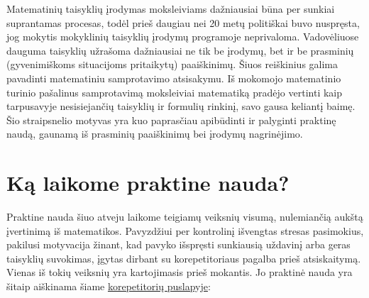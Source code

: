 \documentclass{article}
\begin{document}
Matematinių taisyklių įrodymas moksleiviams dažniausiai būna per sunkiai suprantamas procesas, todėl prieš daugiau nei 20 metų politiškai buvo nuspręsta, jog mokytis mokyklinių taisyklių įrodymų programoje neprivaloma. Vadovėliuose dauguma taisyklių užrašoma dažniausiai ne tik be įrodymų, bet ir be prasminių (gyvenimiškoms situacijoms pritaikytų) paaiškinimų. Šiuos reiškinius galima pavadinti matematiniu samprotavimo atsisakymu. Iš mokomojo matematinio turinio pašalinus samprotavimą moksleiviai matematiką pradėjo vertinti kaip tarpusavyje nesisiejančių taisyklių ir formulių rinkinį, savo gausa keliantį baimę. Šio straipsnelio motyvas yra kuo paprasčiau apibūdinti ir palyginti praktinę naudą, gaunamą iš prasminių paaiškinimų bei įrodymų nagrinėjimo.
\section*{Ką laikome praktine nauda?}
Praktine nauda šiuo atveju laikome teigiamų veiksnių visumą, nulemiančią aukštą įvertinimą iš matematikos. Pavyzdžiui per kontrolinį išvengtas stresas pasimokius, pakilusi motyvacija žinant, kad pavyko išspręsti sunkiausią uždavinį arba geras taisyklių suvokimas, įgytas dirbant su korepetitoriaus pagalba prieš atsiskaitymą. Vienas iš tokių veiksnių yra kartojimasis prieš mokantis. Jo praktinė nauda yra šitaip aiškinama šiame \href{https://www.pasimokome.lt/2017/12/20/kaip-nepamirsti-ka-ismokai/}{korepetitorių puslapyje}:
\newline
\newline
\edef\myindent{\the\parindent}
\end{document}
